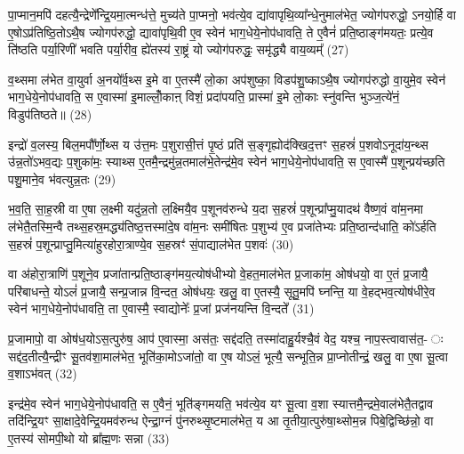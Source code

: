 पा॒प्मान॒मपि॑ दहत्यै॒न्द्रेणे᳚न्द्रि॒यमा॒त्मन्ध॑त्ते॒ मुच्य॑ते पा॒प्मनो॒ भव॑त्ये॒व द्या॑वापृथि॒व्या᳚न्धे॒नुमाल॑भेत॒ ज्योग॑परुद्धो॒ \-ऽनयो॒र्\mbox{}हि वा ए॒षो\-ऽप्र॑तिष्ठि॒तो\-ऽथै॒ष ज्योगप॑रुद्धो॒ द्यावा॑पृथि॒वी ए॒व स्वेन॑ भाग॒धेये॒नोप॑धावति॒ ते ए॒वैनं॑ प्रति॒ष्ठाङ्ग॑मयतः॒ प्रत्ये॒व ति॑ष्ठति पर्या॒रिणी॑ भवति पर्या॒रीव॒ ह्ये॑तस्य॑ रा॒ष्ट्रं यो ज्योग॑परुद्धः॒ समृ॑द्ध्यै वाय॒व्यम्᳚ (27)

व॒थ्समा ल॑भेत वा॒युर्वा अ॒नयो᳚र्व॒थ्स इ॒मे वा ए॒तस्मै॑ लो॒का अप॑शुष्का॒ विडप॑शु॒ष्का\-ऽथै॒ष ज्योगप॑रुद्धो वा॒युमे॒व स्वेन॑ भाग॒धेये॒नोप॑धावति॒ स ए॒वास्मा॑ इ॒माल्लोँ॒काऩ् विशं॒ प्रदा॑पयति॒ प्रास्मा॑ इ॒मे लो॒काः स्नु॑वन्ति भुञ्ज॒त्ये॑नं॒ विडुप॑तिष्ठते॥ (28)

{\anuvakamend[{म॒द्ध्यन्दि॑ने॒ कद्रुं॑ य॒मस्य॒ स्पर्द्ध॑मानो वैष्णावरु॒णीन्तमिन्द्रो᳚\-ऽस्य॒ स्वेन॑ भाग॒धेये॒नोप॑सृतो वाय॒व्यं॑ द्विच॑त्वारिꣳशच्च। (4)।}]}

इन्द्रो॑ व॒लस्य॒ बिल॒मपौ᳚र्णो॒थ्स य उ॑त्त॒मः प॒शुरासी॒त्तं पृ॒ष्ठं प्रति॑ स॒ङ्गृह्योद॑क्खिद॒त्तꣳ स॒हस्रं॑ प॒शवो\-ऽनूदा॑य॒न्थ्स उ॑न्न॒तो॑\-ऽभव॒द्यः प॒शुका॑मः॒ स्याथ्स ए॒तमै॒न्द्रमु॑न्न॒तमाल॑भे॒तेन्द्र॑मे॒व स्वेन॑ भाग॒धेये॒नोप॑धावति॒ स ए॒वास्मै॑ प॒शून्प्रय॑च्छति पशु॒माने॒व भ॑वत्युन्न॒तः (29)

भ॒व॒ति॒ सा॒ह॒स्री वा ए॒षा ल॒क्ष्मी यदु॑न्न॒तो ल॒क्ष्मियै॒व प॒शूनव॑रुन्धे य॒दा स॒हस्रं॑ प॒शून्प्रा᳚प्मु॒यादथ॑ वैष्ण॒वं वा॑म॒नमा ल॑भेतै॒तस्मि॒न्वै तथ्स॒हस्र॒मद्ध्य॑तिष्ठ॒त्तस्मा॑दे॒ष वा॑म॒नः समी॑षितः प॒शुभ्य॑ ए॒व प्रजा॑तेभ्यः प्रति॒ष्ठान्द॑धाति॒ को॑\-ऽर्\mbox{}हति स॒हस्रं॑ प॒शून्प्राप्तु॒मित्या॑हुरहोरा॒त्राण्ये॒व स॒हस्रꣳ॑ सं॒पाद्याल॑भेत प॒शवः॑ (30)

वा अ॑होरा॒त्राणि॑ प॒शूने॒व प्रजा॑तान्प्रति॒ष्ठाङ्ग॑मय॒त्योष॑धीभ्यो वे॒हत॒माल॑भेत प्र॒जाका॑म॒ ओष॑धयो॒ वा ए॒तं प्र॒जायै॒ परि॑बाधन्ते॒ यो\-ऽलं॑ प्र॒जायै॒ सन्प्र॒जान्न वि॒न्दत॒ ओष॑धयः॒ खलु॒ वा ए॒तस्यै॒ सूतु॒मपि॑ घ्नन्ति॒ या वे॒हद्भव॒त्योष॑धीरे॒व स्वेन॑ भाग॒धेये॒नोप॑धावति॒ ता ए॒वास्मै॒ स्वाद्योनेः᳚ प्र॒जां प्रज॑नयन्ति वि॒न्दते᳚ (31)

प्र॒जामापो॒ वा ओष॑ध॒यो\-ऽस॒त्पुरु॑ष॒ आप॑ ए॒वास्मा॒ अस॑तः॒ सद्द॑दति॒ तस्मा॑दाहु॒र्यश्चै॒वं वेद॒ यश्च॒ नाप॒स्त्वावास॑त॒- ः सद्द॑द॒तीत्यै॒न्द्रीꣳ सू॒तव॑शा॒माल॑भेत॒ भूति॑का॒मो\-ऽजा॑तो॒ वा ए॒ष यो\-ऽलं॒ भूत्यै॒ सन्भूति॒न्न प्रा॒प्नोतीन्द्रं॒ खलु॒ वा ए॒षा सू॒त्वा व॒शा\-ऽभ॑वत् (32)

इन्द्र॑मे॒व स्वेन॑ भाग॒धेये॒नोप॑धावति॒ स ए॒वैनं॒ भूति॑ङ्गमयति॒ भव॑त्ये॒व यꣳ सू॒त्वा व॒शा स्यात्तमै॒न्द्रमे॒वाल॑भेतै॒तद्वाव तदि॑न्द्रि॒यꣳ सा॒क्षादे॒वेन्द्रि॒यमव॑रुन्ध ऐन्द्रा॒ग्नं पु॑नरुथ्सृ॒ष्टमाल॑भेत॒ य आ तृ॒तीया॒त्पुरु॑षा॒थ्सोम॒न्न पिबे॒द्विच्छि॑न्नो॒ वा ए॒तस्य॑ सोमपी॒थो यो ब्रा᳚ह्म॒णः सन्ना (33)

